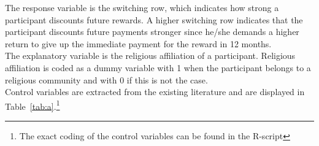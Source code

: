 \documentclass[10pt,a4paper]{article}
\begin{document}
The response variable is the switching row, which indicates how strong a participant discounts future rewards. A higher switching row indicates that the participant discounts future payments stronger since he/she demands a higher return to give up the immediate payment for the reward in 12 months.\\
The explanatory variable is the religious affiliation of a participant. Religious affiliation is coded as a dummy variable with 1 when the participant belongs to a religious community and with 0 if this is not the case.\\
Control variables are extracted from the existing literature and are displayed in Table~\ref{tab:a}.\footnote{The exact coding of the control variables can be found in the R-script}


\begin{table}[!htbp] 
\centering 
  \caption{Control variables}\label{tab:a}
\begin{center}
\end{center}
\end{table}

\end{document}
